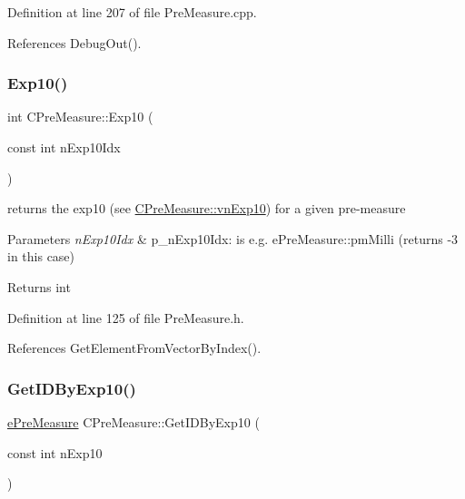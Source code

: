 Definition at line 207 of file Pre\+Measure.\+cpp.



References Debug\+Out().

\mbox{\label{classCPreMeasure_a1f6c35d76304a9eeb8105a53df63df0f}} 
\subsubsection{\texorpdfstring{Exp10()}{Exp10()}}
{\footnotesize\ttfamily int C\+Pre\+Measure\+::\+Exp10 (\begin{DoxyParamCaption}\item[{const int}]{n\+Exp10\+Idx }\end{DoxyParamCaption})\hspace{0.3cm}{\ttfamily [inline]}}



returns the exp10 (see \hyperlink{classCPreMeasure_a2c50eadae55427f0d77a013b3fab0fdb}{C\+Pre\+Measure\+::vn\+Exp10}) for a given pre-\/measure 


\begin{DoxyParams}{Parameters}
{\em n\+Exp10\+Idx} & p\+\_\+n\+Exp10\+Idx\+: is e.\+g. e\+Pre\+Measure\+::pm\+Milli (returns -\/3 in this case) \\
\hline
\end{DoxyParams}
\begin{DoxyReturn}{Returns}
int 
\end{DoxyReturn}


Definition at line 125 of file Pre\+Measure.\+h.



References Get\+Element\+From\+Vector\+By\+Index().

\mbox{\label{classCPreMeasure_a4f198103711ef15bac65a5011f32923e}} 
\subsubsection{\texorpdfstring{Get\+I\+D\+By\+Exp10()}{GetIDByExp10()}}
{\footnotesize\ttfamily \hyperlink{PreMeasure_8h_a6c81167b8d4c2badde42f81cb7214620}{e\+Pre\+Measure} C\+Pre\+Measure\+::\+Get\+I\+D\+By\+Exp10 (\begin{DoxyParamCaption}\item[{const int}]{n\+Exp10 }\end{DoxyParamCaption})}




